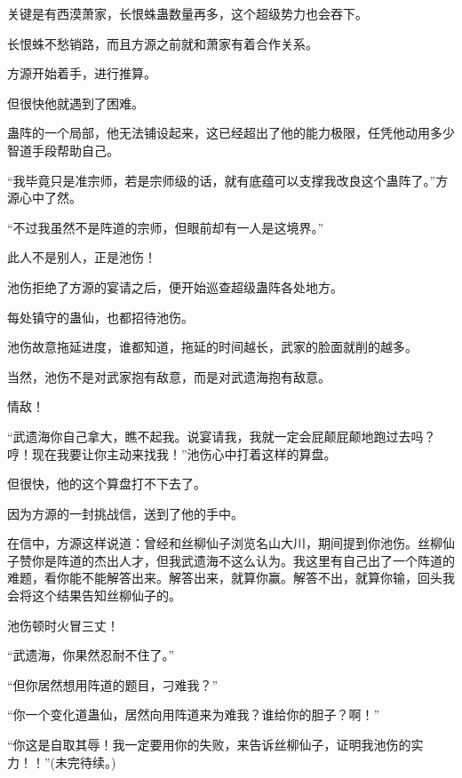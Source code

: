 \begin{this_body}
关键是有西漠萧家，长恨蛛蛊数量再多，这个超级势力也会吞下。

长恨蛛不愁销路，而且方源之前就和萧家有着合作关系。

方源开始着手，进行推算。

但很快他就遇到了困难。

蛊阵的一个局部，他无法铺设起来，这已经超出了他的能力极限，任凭他动用多少智道手段帮助自己。

“我毕竟只是准宗师，若是宗师级的话，就有底蕴可以支撑我改良这个蛊阵了。”方源心中了然。

“不过我虽然不是阵道的宗师，但眼前却有一人是这境界。”

此人不是别人，正是池伤！

池伤拒绝了方源的宴请之后，便开始巡查超级蛊阵各处地方。

每处镇守的蛊仙，也都招待池伤。

池伤故意拖延进度，谁都知道，拖延的时间越长，武家的脸面就削的越多。

当然，池伤不是对武家抱有敌意，而是对武遗海抱有敌意。

情敌！

“武遗海你自己拿大，瞧不起我。说宴请我，我就一定会屁颠屁颠地跑过去吗？哼！现在我要让你主动来找我！”池伤心中打着这样的算盘。

但很快，他的这个算盘打不下去了。

因为方源的一封挑战信，送到了他的手中。

在信中，方源这样说道：曾经和丝柳仙子浏览名山大川，期间提到你池伤。丝柳仙子赞你是阵道的杰出人才，但我武遗海不这么认为。我这里有自己出了一个阵道的难题，看你能不能解答出来。解答出来，就算你赢。解答不出，就算你输，回头我会将这个结果告知丝柳仙子的。

池伤顿时火冒三丈！

“武遗海，你果然忍耐不住了。”

“但你居然想用阵道的题目，刁难我？”

“你一个变化道蛊仙，居然向用阵道来为难我？谁给你的胆子？啊！”

“你这是自取其辱！我一定要用你的失败，来告诉丝柳仙子，证明我池伤的实力！！”(未完待续。)

\end{this_body}

